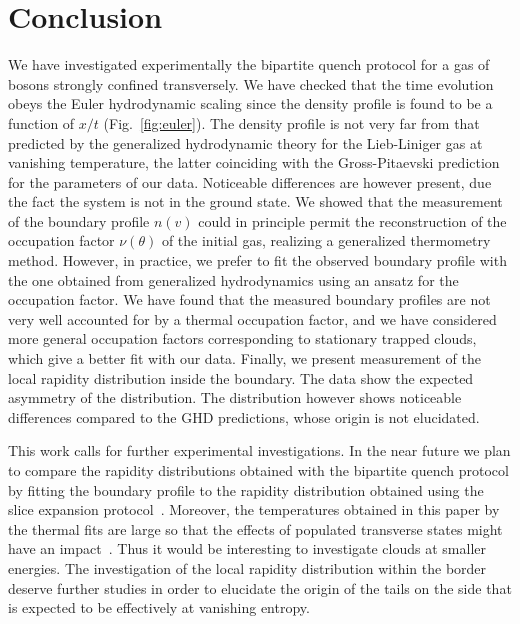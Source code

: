 \section{Conclusion}
We have investigated experimentally the bipartite quench protocol for a gas of bosons strongly confined transversely. We have checked that the time evolution
obeys the Euler hydrodynamic scaling since the density profile is found to be a function of $x/t$ (Fig.~\ref{fig:euler}). The density profile is not very far from that predicted by the generalized hydrodynamic theory for the Lieb-Liniger gas at vanishing temperature,
the latter coinciding with the 
Gross-Pitaevski prediction for the parameters of our data.
Noticeable differences
are however present, due the fact the system is not in 
the ground state.
We showed that the measurement of the boundary profile $n(v)$ could in principle permit the reconstruction of the occupation factor $\nu(\theta)$ of the initial gas, realizing a generalized thermometry method. 
However, in practice, we prefer to fit the observed boundary profile with the one obtained from generalized hydrodynamics using an ansatz for the occupation factor.
We have found that the measured boundary profiles are not very well accounted for by a thermal 
occupation factor, and we have considered more general occupation factors corresponding to stationary trapped clouds, which give a better fit with our data. Finally, we present measurement of the local rapidity distribution inside the 
boundary. The data show the expected asymmetry of the distribution. The distribution however shows noticeable  differences compared to  the GHD predictions, whose 
origin is not elucidated.

This work calls for further  experimental investigations. In the near future we plan to compare the rapidity distributions
obtained with the  bipartite quench protocol by fitting the boundary profile
to the  rapidity distribution obtained using the 
slice expansion protocol~\cite{dubois_probing_2024}.
Moreover, the temperatures obtained in this paper by the thermal fits are large so that the
effects of populated transverse states might have an impact~\cite{moller2021extension,cataldini2022emergent}. Thus it would be interesting to investigate clouds at smaller energies. 
The investigation of the local rapidity distribution within the border 
deserve further studies in order to elucidate the origin of the tails 
on the side that is expected to be effectively at vanishing entropy.  